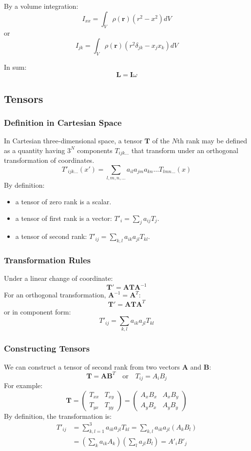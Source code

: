 \documentclass[12pt]{article}
\renewcommand{\vec}[1]{\mathbf{#1}}
\begin{document}
	By a volume integration:
	\[
	I_{xx} = \int_V \rho(\vec{r}) (r^2 - x^2) dV
	\]
	or
	\[
	I_{jk} = \int_V \rho(\vec{r}) (r^2 \delta_{jk} - x_j x_k) dV
	\]
	
	In sum:
	\[
	\vec{L} = \mathbf{I} \omega
	\]
	
	\subsection{Tensors}
	
	\subsubsection{Definition in Cartesian Space}
	In Cartesian three-dimensional space, a tensor $\mathbf{T}$ of the $N$th rank may be defined as a quantity having $3^N$ components $T_{ijk...}$ that transform under an orthogonal transformation of coordinates.
	\[
	T'_{ijk...} (x') = \sum_{l,m,n,...} a_{il} a_{jm} a_{kn} \dots T_{lmn...} (x)
	\]
	By definition:
	\begin{itemize}
		\item a tensor of zero rank is a scalar.
		\item a tensor of first rank is a vector: $T'_i = \sum_j a_{ij} T_j$.
		\item a tensor of second rank: $T'_{ij} = \sum_{k,l} a_{ik} a_{jl} T_{kl}$.
	\end{itemize}
	
	\subsubsection{Transformation Rules}
	Under a linear change of coordinate:
	\[
	\mathbf{T'} = \mathbf{A} \mathbf{T} \mathbf{A}^{-1}
	\]
	For an orthogonal transformation, $\mathbf{A}^{-1} = \mathbf{A}^T$:
	\[
	\mathbf{T'} = \mathbf{A} \mathbf{T} \mathbf{A}^T
	\]
	or in component form:
	\[
	T'_{ij} = \sum_{k,l} a_{ik} a_{jl} T_{kl}
	\]
	
	\subsubsection{Constructing Tensors}
	We can construct a tensor of second rank from two vectors $\vec{A}$ and $\vec{B}$:
	\[
	\mathbf{T} = \vec{A} \vec{B}^T \quad \text{or} \quad T_{ij} = A_i B_j
	\]
	For example:
	\[
	\mathbf{T} =
	\begin{pmatrix}
		T_{xx} & T_{xy} \\
		T_{yx} & T_{yy}
	\end{pmatrix}
	=
	\begin{pmatrix}
		A_x B_x & A_x B_y \\
		A_y B_x & A_y B_y
	\end{pmatrix}
	\]
	By definition, the transformation is:
	\begin{align*}
		T'_{ij} &= \sum_{k,l=1}^3 a_{ik} a_{jl} T_{kl} = \sum_{k,l} a_{ik} a_{jl} (A_k B_l) \\
		&= (\sum_k a_{ik} A_k) (\sum_l a_{jl} B_l) = A'_i B'_j
	\end{align*}
	
\end{document}
